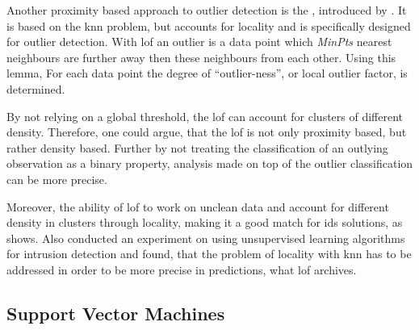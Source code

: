 Another proximity based approach to outlier detection is the , introduced by \textcite{Breunig2000}. It is based on the \gls{knn} problem, but accounts for locality and is specifically designed for outlier detection.
With \gls{lof} an outlier is a data point which \emph{MinPts} nearest neighbours are further away then these neighbours from each other. 
Using this lemma, For each data point the degree of \enquote{outlier-ness}, or local outlier factor, is determined.

By not relying on a global threshold, the \gls{lof} can account for clusters of different density. Therefore, one could argue, that the \gls{lof} is not only proximity based, but rather density based. Further by not treating the classification of an outlying observation as a binary property, analysis made on top of the outlier classification can be more precise. \parencite[cf.][]{Breunig2000}

Moreover, the ability of \gls{lof} to work on unclean data and account for different density in clusters through locality, making it a good match for \gls{ids} solutions, as \textcite{Lazarevic2003} shows. Also \textcite{Zanero2004} conducted an experiment on using unsupervised learning algorithms for intrusion detection and found, that the problem of locality with \gls{knn} has to be addressed in order to be more precise in predictions, what \gls{lof} archives.

\subsection{Support Vector Machines}
\label{sec:background:network:novelty:svm}

